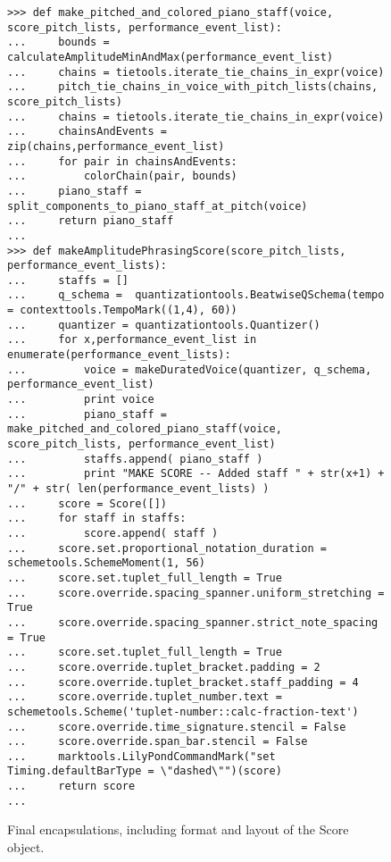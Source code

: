 \begin{figure}[H]
\begin{lstlisting}[basicstyle=\scriptsize\ttfamily, breaklines=True, tabsize=4, showtabs=false, showspaces=false]
>>> def make_pitched_and_colored_piano_staff(voice, score_pitch_lists, performance_event_list):
...     bounds = calculateAmplitudeMinAndMax(performance_event_list)
...     chains = tietools.iterate_tie_chains_in_expr(voice)
...     pitch_tie_chains_in_voice_with_pitch_lists(chains, score_pitch_lists)
...     chains = tietools.iterate_tie_chains_in_expr(voice)
...     chainsAndEvents = zip(chains,performance_event_list)
...     for pair in chainsAndEvents:
...         colorChain(pair, bounds)
...     piano_staff = split_components_to_piano_staff_at_pitch(voice)
...     return piano_staff 
... 
>>> def makeAmplitudePhrasingScore(score_pitch_lists, performance_event_lists):
...     staffs = []
...     q_schema =  quantizationtools.BeatwiseQSchema(tempo = contexttools.TempoMark((1,4), 60))
...     quantizer = quantizationtools.Quantizer()
...     for x,performance_event_list in enumerate(performance_event_lists):
...         voice = makeDuratedVoice(quantizer, q_schema, performance_event_list)
...         print voice
...         piano_staff = make_pitched_and_colored_piano_staff(voice, score_pitch_lists, performance_event_list)
...         staffs.append( piano_staff )
...         print "MAKE SCORE -- Added staff " + str(x+1) + "/" + str( len(performance_event_lists) )
...     score = Score([])
...     for staff in staffs:
...         score.append( staff )
...     score.set.proportional_notation_duration = schemetools.SchemeMoment(1, 56)
...     score.set.tuplet_full_length = True
...     score.override.spacing_spanner.uniform_stretching = True
...     score.override.spacing_spanner.strict_note_spacing = True
...     score.set.tuplet_full_length = True
...     score.override.tuplet_bracket.padding = 2
...     score.override.tuplet_bracket.staff_padding = 4
...     score.override.tuplet_number.text = schemetools.Scheme('tuplet-number::calc-fraction-text')
...     score.override.time_signature.stencil = False
...     score.override.span_bar.stencil = False
...     marktools.LilyPondCommandMark("set Timing.defaultBarType = \"dashed\"")(score)
...     return score
... \end{lstlisting}

\caption{Final encapsulations, including format and layout of the Score object. } 
\end{figure}

